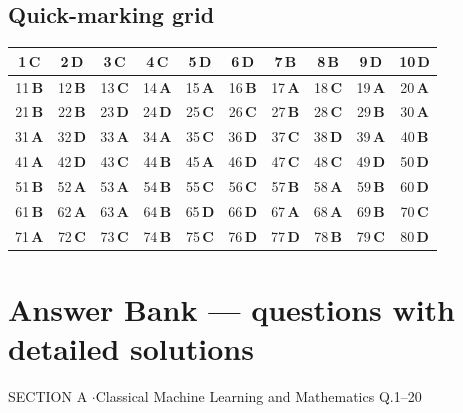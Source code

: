 \documentclass[11pt,a4paper]{article}
\begin{document}
\subsection*{Quick-marking grid}
\begin{center}\renewcommand{\arraystretch}{1.3}
\begin{tabular}{|c|c|c|c|c|c|c|c|c|c|}\hline
1\,\textbf{C} & 2\,\textbf{D} & 3\,\textbf{C} & 4\,\textbf{C} & 5\,\textbf{D} & 6\,\textbf{D} & 7\,\textbf{B} & 8\,\textbf{B} & 9\,\textbf{D} & 10\,\textbf{D} \\
\hline
11\,\textbf{B} & 12\,\textbf{B} & 13\,\textbf{C} & 14\,\textbf{A} & 15\,\textbf{A} & 16\,\textbf{B} & 17\,\textbf{A} & 18\,\textbf{C} & 19\,\textbf{A} & 20\,\textbf{A} \\
\hline
21\,\textbf{B} & 22\,\textbf{B} & 23\,\textbf{D} & 24\,\textbf{D} & 25\,\textbf{C} & 26\,\textbf{C} & 27\,\textbf{B} & 28\,\textbf{C} & 29\,\textbf{B} & 30\,\textbf{A} \\
\hline
31\,\textbf{A} & 32\,\textbf{D} & 33\,\textbf{A} & 34\,\textbf{A} & 35\,\textbf{C} & 36\,\textbf{D} & 37\,\textbf{C} & 38\,\textbf{D} & 39\,\textbf{A} & 40\,\textbf{B} \\
\hline
41\,\textbf{A} & 42\,\textbf{D} & 43\,\textbf{C} & 44\,\textbf{B} & 45\,\textbf{A} & 46\,\textbf{D} & 47\,\textbf{C} & 48\,\textbf{C} & 49\,\textbf{D} & 50\,\textbf{D} \\
\hline
51\,\textbf{B} & 52\,\textbf{A} & 53\,\textbf{A} & 54\,\textbf{B} & 55\,\textbf{C} & 56\,\textbf{C} & 57\,\textbf{B} & 58\,\textbf{A} & 59\,\textbf{B} & 60\,\textbf{D} \\
\hline
61\,\textbf{B} & 62\,\textbf{A} & 63\,\textbf{A} & 64\,\textbf{B} & 65\,\textbf{D} & 66\,\textbf{D} & 67\,\textbf{A} & 68\,\textbf{A} & 69\,\textbf{B} & 70\,\textbf{C} \\
\hline
71\,\textbf{A} & 72\,\textbf{C} & 73\,\textbf{C} & 74\,\textbf{B} & 75\,\textbf{C} & 76\,\textbf{D} & 77\,\textbf{D} & 78\,\textbf{B} & 79\,\textbf{C} & 80\,\textbf{D} \\
\hline\end{tabular}\end{center}
\newpage
\section*{Answer Bank --- questions with detailed solutions}\label{bank}

\begin{sectionbanner}SECTION A \enspace$\cdot$\enspace Classical Machine Learning and Mathematics \hfill Q.1--20\end{sectionbanner}
\end{document}
